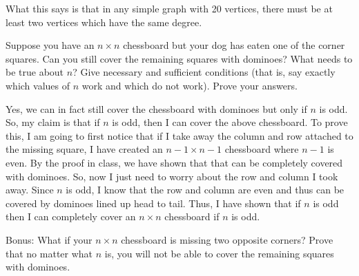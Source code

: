 \begin{questions}
\begin{solution}
  What this says is that in any simple graph with 20 vertices, there must be at least two vertices which have the same degree.
\end{solution}


\question Suppose you have an $n\times n$ chessboard but your dog has eaten one of the corner squares. Can you still cover the remaining squares with dominoes? What needs to be true about $n$? Give necessary and sufficient conditions (that is, say exactly which values of $n$ work and which do not work). Prove your answers.

\begin{center}
\end{center}
\begin{solution}
Yes, we can in fact still cover the chessboard with dominoes but only if $n$ is odd. So, my claim is that if $n$ is odd, then I can cover the above chessboard. 
To prove this, I am going to first notice that if I take away the column and row attached to the missing square, I have created an $n-1\times n-1$ chessboard where $n-1$ is even. By the proof in class, we have shown that that can be completely covered with dominoes. So, now I just need to worry about the row and column I took away. Since $n$ is odd, I know that the row and column are even and thus can be covered by dominoes lined up head to tail. Thus, I have shown that if $n$ is odd then I can completely cover an $n\times n$ chessboard if $n$ is odd.
\end{solution}

\question Bonus: What if your $n\times n$ chessboard is missing two opposite corners?  Prove that no matter what $n$ is, you will not be able to cover the remaining squares with dominoes. 

\begin{center}
\end{center}


\end{questions}
